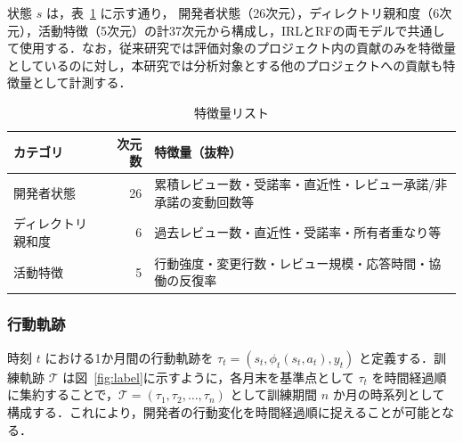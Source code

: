 \documentclass[submit,noauthor,ses,dvipdfmx]{ipsj}
\newcommand{\todo}[1]{\colorbox{yellow}{{\bf TODO}:}{\color{red} {\textbf{[#1]}}}}
\begin{document}
状態 $s$ は，表~\ref{tab:features} に示す通り，
開発者状態（26次元），ディレクトリ親和度（6次元），活動特徴（5次元）の計37次元から構成し，IRLとRFの両モデルで共通して使用する．なお，従来研究では評価対象のプロジェクト内の貢献のみを特徴量としているのに対し，本研究では分析対象とする他のプロジェクトへの貢献も特徴量として計測する．

\begin{table}[t]
\vspace{-4mm}
\caption{特徴量リスト}
\label{tab:features}
\centering
\begin{tabular}{p{1.7cm}rp{4.5cm}}
\hline
カテゴリ & 次元数 & 特徴量（抜粋） \\
\hline
開発者状態 & 26 & 累積レビュー数・受諾率・直近性・レビュー承諾/非承諾の変動回数等 \\
ディレクトリ親和度 & 6 & 過去レビュー数・直近性・受諾率・所有者重なり等 \\
活動特徴 & 5 & 行動強度・変更行数・レビュー規模・応答時間・協働の反復率 \\
\hline
\end{tabular}
\end{table}

\subsubsection{行動軌跡}

時刻 $t$ における1か月間の行動軌跡を $\tau_t = (s_t, \phi_{t}(s_t, a_t), y_t)$ と定義する．訓練軌跡 $\mathcal{T}$ は図~\ref{fig:label}に示すように，各月末を基準点として $\tau_t$ を時間経過順に集約することで，$\mathcal{T} = (\tau_1, \tau_2, \ldots, \tau_n)$ として訓練期間 $n$ か月の時系列として構成する．これにより，開発者の行動変化を時間経過順に捉えることが可能となる．
\end{document}
